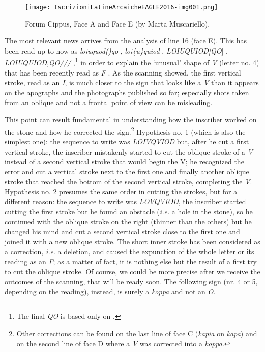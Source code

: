 \documentclass[amsthm,ebook]{saparticle}
\begin{document}
\begin{figure}[!bp]
\centering
 \texttt{[image: IscrizioniLatineArcaicheEAGLE2016-img001.png]}
\caption{Forum Cippus, Face A and Face E (by Marta Muscariello).}
\label{fig:1}
\end{figure}





The most relevant news arrives from the analysis of line 16 (face E). This has been read up to now as \emph{loiuquod()qo}
\citep{wachter_altlateinische_1987}, \emph{loi\{u\}quiod} \citep{_studies_1993}, \emph{LOIUQUIOD[QO}] \citep{baldi_foundations_2002}, \emph{LOIUQUIOD,QO///} \citep{hartmann_fruhlateinischen_2005},\footnote{The
final \emph{QO} is based only on \citet{goidanich_rapporti_1943}.} in order to explain the `unusual' shape of \emph{V} (letter no. 4) that has
been recently read as \emph{F} \citep{prosdocimi_roma_2010}. As the scanning showed, the first vertical stroke, read as an \emph{I}, is much
closer to the sign that looks like a \emph{V} than it appears on the apographs and the photographs published so far;
especially shots taken from an oblique and not a frontal point of view can be misleading. 

This point can result fundamental in understanding how the inscriber worked on the stone and how he corrected the
sign.\footnote{Other corrections can be found on the last line of face C (\emph{kapia} on \emph{kapa}) and on the second line of face
D where a \emph{V} was corrected into a \emph{koppa}. } Hypothesis no. 1 (which is also the simplest one): the sequence to write was
\emph{LOIVQVIOD} but, after he cut a first vertical stroke, the inscriber mistakenly started to cut the oblique stroke of a \emph{V}
instead of a second vertical stroke that would begin the V; he recognized the error and cut a vertical stroke next to
the first one and finally another oblique stroke that reached the bottom of the second vertical stroke, completing the
\emph{V}. Hypothesis no. 2 presumes the same order in cutting the strokes, but for a different reason: the sequence to write
was \emph{LOVQVIOD}, the inscriber started cutting the first stroke but he found an obstacle (\emph{i.e.} a hole in the stone), so he
continued with the oblique stroke on the right (thinner than the others) but he changed his mind and cut a second
vertical stroke close to the first one and joined it with a new oblique stroke. The short inner stroke has been
considered as a correction, \emph{i.e}. a deletion, and caused the expunction of the whole letter or its reading as an \emph{F}; as a
matter of fact, it is nothing else but the result of a first try to cut the oblique stroke. Of course, we could be more
precise after we receive the outcomes of the scanning, that will be ready soon. The following sign (nr. 4 or 5,
depending on the reading), instead, is surely a \emph{koppa} and not an \emph{O}.
\end{document}
